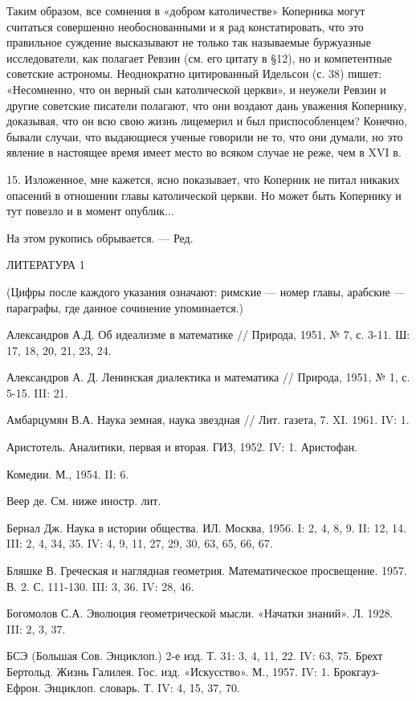 Таким образом, все сомнения в «добром католичестве» Коперника могут
считаться совершенно необоснованными и я рад констатировать, что это
правильное суждение высказывают не только так называемые буржуазные
исследователи, как полагает Ревзин (см. его цитату в §12), но и
компетентные советские астрономы. Неоднократно цитированный Идельсон
(с. 38) пишет: «Несомненно, что он верный сын католической церкви», и
неужели Ревзин и другие советские писатели полагают, что они воздают
дань уважения Копернику, доказывая, что он всю свою жизнь лицемерил и
был приспособленцем? Конечно, бывали случаи, что выдающиеся ученые
говорили не то, что они думали, но это явление в настоящее время имеет
место во всяком случае не реже, чем в XVI в.

15. Изложенное, мне кажется, ясно показывает, что Коперник не питал
никаких опасений в отношении главы католической церкви. Но может быть
Копернику и тут повезло и в момент опублик...

На этом рукопись обрывается. --- Ред.

ЛИТЕРАТУРА 1

(Цифры после каждого указания означают: римские --- номер главы,
арабские --- параграфы, где данное сочинение упоминается.)

Александров А.Д. Об идеализме в математике // Природа, 1951, № 7, с.
3-11. Ш: 17, 18, 20, 21, 23, 24.

Александров А. Д. Ленинская диалектика и математика // Природа, 1951,
№ 1, с. 5-15. III: 21.

Амбарцумян В.А. Наука земная, наука звездная // Лит. газета, 7. XI.
1961. IV: 1.

Аристотель. Аналитики, первая и вторая. ГИЗ, 1952. IV: 1. Аристофан.

Комедии. М., 1954. II: 6.

Веер де. См. ниже иностр. лит.

Бернал Дж. Наука в истории общества. ИЛ. Москва, 1956. I: 2, 4, 8, 9.
II: 12, 14. III: 2, 4, 34, 35. IV: 4, 9, 11, 27, 29, 30, 63, 65, 66,
67.

Бляшке В. Греческая и наглядная геометрия. Математическое просвещение.
1957. В. 2. С. 111-130. III: 3, 36. IV: 28, 46.

Богомолов С.А. Эволюция геометрической мысли. «Начатки знаний». Л.
1928. III: 2, 3, 37.

БСЭ (Большая Сов. Энциклоп.) 2-е изд. Т. 31: 3, 4, 11, 22. IV: 63, 75.
Брехт Бертольд. Жизнь Галилея. Гос. изд. «Искусство». М., 1957. IV:
1. Брокгауз-Ефрон. Энциклоп. словарь. Т. IV: 4, 15, 37, 70.

